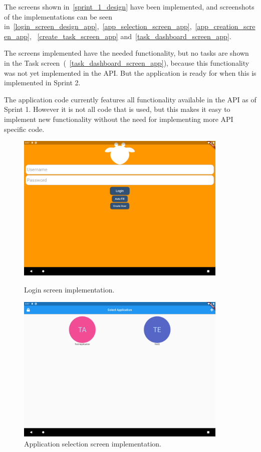 The screens shown in~\autoref{sprint_1_design} have been implemented, and screenshots of the implementations can be seen in~\autoref{login_screen_design_app},~\autoref{app_selection_screen_app},~\autoref{app_creation_screen_app}, ~\autoref{create_task_screen_app} and~\autoref{task_dashboard_screen_app}.

The screens implemented have the needed functionality, but no tasks are shown in the Task screen~(~\autoref{task_dashboard_screen_app}), because this functionality was not yet implemented in the API.
But the application is ready for when this is implemented in Sprint 2.

The application code currently features all functionality available in the API as of Sprint 1.
However it is not all code that is used, but this makes it easy to implement new functionality without the need for implementing more API specific code. 


\begin{figure}[H]
    \centering
    \begin{minipage}{0.45\textwidth}
        \centering
        \includegraphics[width=0.9\textwidth]{Sprint_1/images/login_screen_app.png}
        \caption{Login screen implementation.}
        \label{login_screen_design_app}
    \end{minipage}\hfill
    \begin{minipage}{0.45\textwidth}
        \includegraphics[width=0.9\textwidth]{Sprint_1/images/app_selection_screen_app.png}
        \caption{Application selection screen implementation.}
        \label{app_selection_screen_app}
    \end{minipage}
\end{figure}

